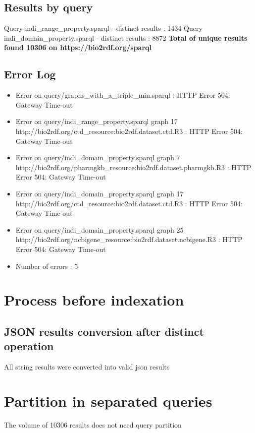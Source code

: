 \documentclass[a4paper,12pt]{article}
\begin{document}
\subsection{Results by query}
Query indi\_range\_property.sparql - distinct results : 1434
\newline
Query indi\_domain\_property.sparql - distinct results : 8872
\newline
\textbf{Total of unique results found 10306 on https://bio2rdf.org/sparql 
}\subsection{Error Log}
\begin{itemize}
\item Error on  query/graphs\_with\_a\_triple\_min.sparql : HTTP Error 504: Gateway Time-out\item Error on query/indi\_range\_property.sparql graph 17 http://bio2rdf.org/ctd\_resource:bio2rdf.dataset.ctd.R3 : HTTP Error 504: Gateway Time-out\item Error on query/indi\_domain\_property.sparql graph 7 http://bio2rdf.org/pharmgkb\_resource:bio2rdf.dataset.pharmgkb.R3 : HTTP Error 504: Gateway Time-out\item Error on query/indi\_domain\_property.sparql graph 17 http://bio2rdf.org/ctd\_resource:bio2rdf.dataset.ctd.R3 : HTTP Error 504: Gateway Time-out\item Error on query/indi\_domain\_property.sparql graph 25 http://bio2rdf.org/ncbigene\_resource:bio2rdf.dataset.ncbigene.R3 : HTTP Error 504: Gateway Time-out\end{itemize}
\begin{itemize}
\item Number of errors : 5
\end{itemize}
\newpage
\section{Process before indexation}
\subsection{JSON results conversion after distinct operation}
All string results were converted into valid json results
\section{Partition in separated queries}
The volume of 10306 results does not need query partition
\newpage
\end{document}

